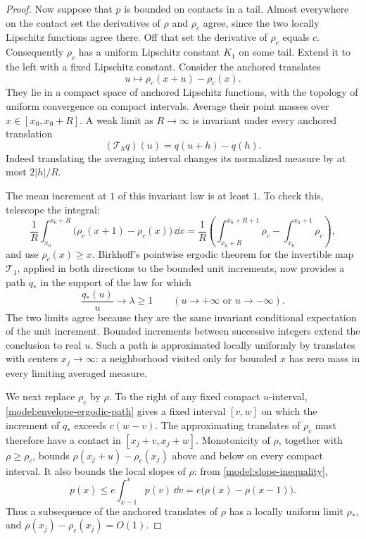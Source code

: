 \begin{proof}
Now suppose that \(p\) is bounded on contacts in a tail.  Almost
everywhere on the contact set the derivatives of \(\rho\) and
\(\rho_c\) agree, since the two locally Lipschitz functions agree
there.  Off that set the derivative of \(\rho_c\) equals \(c\).
Consequently \(\rho_c\) has a uniform Lipschitz constant \(K_1\) on
some tail.  Extend it to the left with a fixed Lipschitz constant.
Consider the anchored translates
\[
 u\longmapsto\rho_c(x+u)-\rho_c(x).
\]
They lie in a compact space of anchored Lipschitz functions, with
the topology of uniform convergence on compact intervals.  Average
their point masses over \(x\in[x_0,x_0+R]\).  A weak limit as
\(R\to\infty\) is invariant under every anchored translation
\[
 (\mathcal T_h q)(u)=q(u+h)-q(h).
\]
Indeed translating the averaging interval changes its normalized
measure by at most \(2|h|/R\).

The mean increment at \(1\) of this invariant law is at least \(1\).
To check this, telescope the integral:
\[
 \frac1R\int_{x_0}^{x_0+R}
       \bigl(\rho_c(x+1)-\rho_c(x)\bigr)\,\dd x
 =
 \frac1R\left(
 \int_{x_0+R}^{x_0+R+1}\rho_c-
 \int_{x_0}^{x_0+1}\rho_c\right),
\]
and use \(\rho_c(x)\ge x\). Birkhoff's pointwise ergodic theorem
\cite[Theorem~6.2.1]{Durrett2019} for the invertible map
\(\mathcal T_1\), applied in both directions to the bounded unit
increments, now provides a
path \(q_*\) in the support of the law for which
\begin{equation}
\label{model:envelope-ergodic-path}
 \frac{q_*(u)}u\longrightarrow\lambda\ge1
 \qquad(u\to+\infty\text{ or }u\to-\infty).
\end{equation}
The two limits agree because they are the same invariant conditional
expectation of the unit increment.  Bounded increments between
successive integers extend the conclusion to real \(u\).
Such a path is approximated locally uniformly by translates with
centers \(x_j\to\infty\): a neighborhood visited only for bounded
\(x\) has zero mass in every limiting averaged measure.

We next replace \(\rho_c\) by \(\rho\).  To the right of any fixed
compact \(u\)-interval, \eqref{model:envelope-ergodic-path} gives a
fixed interval \([v,w]\) on which the increment of \(q_*\) exceeds
\(c(w-v)\).  The approximating translates of \(\rho_c\) must
therefore have a contact in \([x_j+v,x_j+w]\).  Monotonicity of
\(\rho\), together with \(\rho\ge\rho_c\), bounds
\(\rho(x_j+u)-\rho_c(x_j)\) above and below on every compact interval.
It also bounds the local slopes of \(\rho\): from
\eqref{model:slope-inequality},
\[
 p(x)\le e\int_{x-1}^x p(v)\,\dd v
       =e\bigl(\rho(x)-\rho(x-1)\bigr).
\]
Thus a subsequence of the anchored translates of \(\rho\) has a
locally uniform limit \(\rho_*\), and
\(\rho(x_j)-\rho_c(x_j)=O(1)\).


\end{proof}
